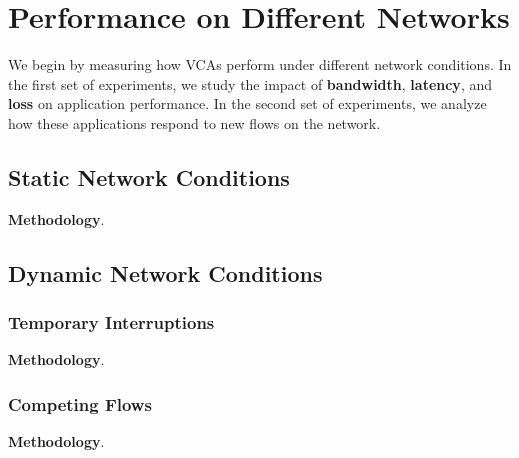 \section{Performance on Different Networks}\label{sec:methodology}
We begin by measuring how VCAs perform under different network conditions. 
In the first set of experiments, we study the impact of \textbf{bandwidth}, \textbf{latency}, 
and \textbf{loss} on application performance. In the second set of experiments, 
we analyze how these applications respond to new flows on the network.
\subsection{Static Network Conditions}


\noindent\textbf{Methodology}. 


\subsection{Dynamic Network Conditions}

\subsubsection{Temporary Interruptions}

\noindent \textbf{Methodology}.

\subsubsection{Competing Flows}

\noindent \textbf{Methodology}.


